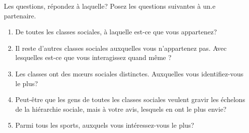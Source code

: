 \begin{frame}{Les questions, répondez à laquelle?}
  Posez les questions suivantes à un.e partenaire.
  \begin{enumerate}
    \item De toutes les classes sociales, à laquelle est-ce que vous appartenez?
    \item Il reste d'autres classes sociales auxquelles vous n'appartenez pas. Avec lesquelles est-ce que vous interagissez quand même ?
    \item Les classes ont des mœurs sociales distinctes. Auxquelles vous identifiez-vous le plus?
    \item Peut-être que les gens de toutes les classes sociales veulent gravir les échelons de la hiérarchie sociale, mais à votre avis, lesquels en ont le plus envie?
    \item Parmi tous les sports, auxquels vous intéressez-vous le plus?
  \end{enumerate}
\end{frame}
